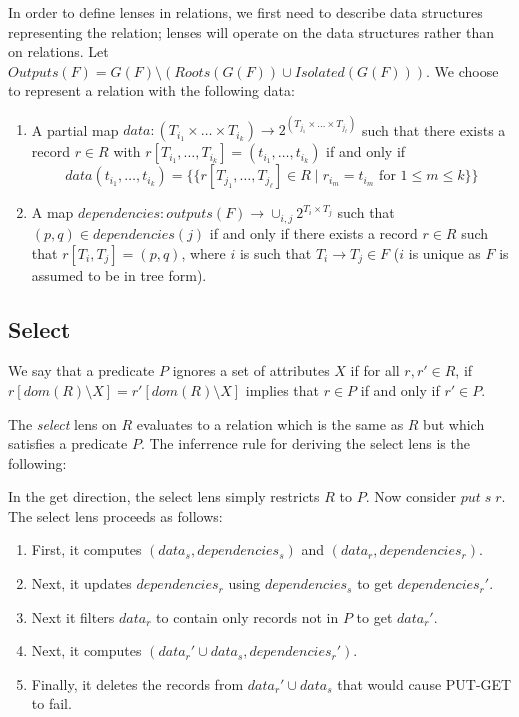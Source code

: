 \documentclass[acmsmall,review,anonymous]{acmart}\settopmatter{printfolios=true,printccs=false,printacmref=false}
\theoremstyle{definition}
\begin{document}
In order to define lenses in relations, we first need to describe data
structures representing the relation; lenses will operate on the data
structures rather than on relations. Let $Outputs(F) = G(F) \setminus
(Roots(G(F)) \cup Isolated(G(F)))$. We choose to represent a relation with the
following data:
\begin{enumerate}
  \item
  A partial map $data : (T_{i_1} \times \ldots \times T_{i_k})
  \longrightarrow 2^{(T_{j_1} \times \ldots \times T_{j_{\ell}})}$ such that
  there exists a record $r \in R$ with $r[T_{i_1}, \ldots, T_{i_k}] =
  (t_{i_1}, \ldots, t_{i_k})$ if and only if
  $$data(t_{i_1}, \ldots, t_{i_k}) =  \{\{r[T_{j_1}, \ldots, T_{j_{\ell}}] \in
  R \; | \; r_{i_m} = t_{i_m} \text{ for }1 \leq m \leq k\}\}$$
  \item
  A map $dependencies : outputs(F) \longrightarrow \cup_{i,j} 2^{T_i \times
  T_j}$ such that $(p, q) \in dependencies(j)$ if and only if there exists a
  record $r \in R$ such that $r[T_i, T_j] = (p, q)$, where $i$ is such that
  $T_i \longrightarrow T_j \in F$ ($i$ is unique as $F$ is assumed to be in tree
  form).
\end{enumerate}
\subsection{Select}
We say that a predicate $P$ ignores a set of attributes $X$ if for all $r, r'
\in R$, if $r[dom(R) \setminus X] = r'[dom(R) \setminus X]$ implies that $r
\in P$ if and only if $r' \in P$.

The {\em select} lens on $R$ evaluates to a relation which is the same as $R$
but which satisfies a predicate $P$. The inferrence rule for deriving the select
lens is the following:
\begin{prooftree}
\end{prooftree}
In the get direction, the select lens simply restricts $R$ to $P$. Now consider
$put \; s \; r$. The select lens proceeds as follows:
\begin{enumerate}
  \item
  First, it computes $(data_s, dependencies_s)$ and $(data_r, dependencies_r)$.
  \item
  Next, it updates $dependencies_r$ using $dependencies_s$ to get
  $dependencies_r'$.
  \item
  Next it filters $data_r$ to contain only records not in $P$ to get $data_r'$.
  \item
  Next, it computes $(data_r' \cup data_s, dependencies_r')$.
  \item
  Finally, it deletes the records from $data_r' \cup data_s$ that would cause
  PUT-GET to fail.
\end{enumerate}
\end{document}
